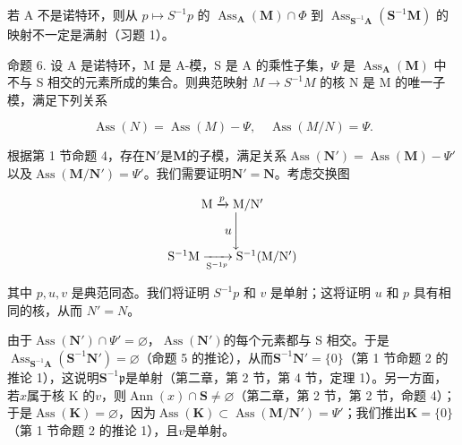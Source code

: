 若 A 不是诺特环，则从 \(p \mapsto S^{-1}p\) 的 \(\operatorname{Ass}_{\mathbf{A}}(\mathbf{M}) \cap \Phi\) 到 \(\operatorname{Ass}_{\mathbf{S}^{-1}\mathbf{A}}(\mathbf{S}^{-1}\mathbf{M})\) 的映射不一定是满射（习题 1）。

命题 6. 设 A 是诺特环，M 是 A-模，S 是 A 的乘性子集，\(\Psi\) 是 \(\operatorname{Ass}_{\mathbf{A}}(\mathbf{M})\) 中不与 S 相交的元素所成的集合。则典范映射 \(M \to S^{-1}M\) 的核 N 是 M 的唯一子模，满足下列关系

\[
\operatorname{Ass} (N) = \operatorname{Ass} (M) - \Psi , \quad \operatorname{Ass} (M / N) = \Psi .\tag{3}
\]

根据第 1 节命题 4，存在\(\mathbf{N}'\)是\(\mathbf{M}\)的子模，满足关系\(\operatorname{Ass}(\mathbf{N}') = \operatorname{Ass}(\mathbf{M}) - \Psi'\)以及\(\operatorname{Ass}(\mathbf{M}/\mathbf{N}') = \Psi'\)。我们需要证明\(\mathbf{N}' = \mathbf{N}\)。考虑交换图

\[
\begin{array}{c} \mathrm{M} \xrightarrow {p} \mathrm{M} / \mathrm{N} ^ {\prime} \\ u \Biggl \downarrow \\ \mathrm{S} ^ {- 1} \mathrm{M} \xrightarrow [ \mathrm{S} ^ {- 1 p} ]{} \mathrm{S} ^ {- 1} (\mathrm{M} / \mathrm{N} ^ {\prime}) \end{array}
\]

其中 \(p, u, v\) 是典范同态。我们将证明 \(S^{-1}p\) 和 \(v\) 是单射；这将证明 \(u\) 和 \(p\) 具有相同的核，从而 \(N' = N\)。

由于\(\operatorname{Ass}(\mathbf{N}') \cap \Psi' = \varnothing\)，\(\operatorname{Ass}(\mathbf{N}')\)的每个元素都与 S 相交。于是\(\operatorname{Ass}_{\mathbf{S}^{-1}\mathbf{A}}(\mathbf{S}^{-1}\mathbf{N}') = \varnothing\)（命题 5 的推论），从而\(\mathbf{S}^{-1}\mathbf{N}' = \{0\}\)（第 1 节命题 2 的推论 1），这说明\(\mathbf{S}^{-1}\mathfrak{p}\)是单射（第二章，第 2 节，第 4 节，定理 1）。另一方面，若\(x\)属于核 K 的\(v\)，则\(\operatorname{Ann}(x) \cap \mathbf{S} \neq \varnothing\)（第二章，第 2 节，第 2 节，命题 4）；于是\(\operatorname{Ass}(\mathbf{K}) = \varnothing\)，因为\(\operatorname{Ass}(\mathbf{K}) \subset \operatorname{Ass}(\mathbf{M}/\mathbf{N}') = \Psi'\)；我们推出\(\mathbf{K} = \{0\}\)（第 1 节命题 2 的推论 1），且\(v\)是单射。

